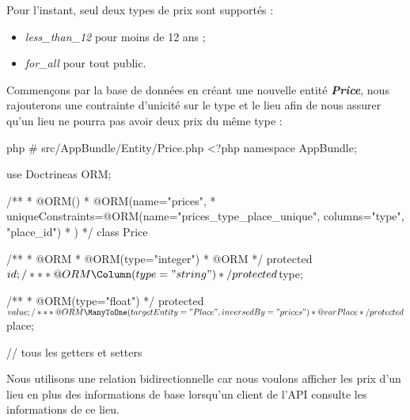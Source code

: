\documentclass[big]{zmdocument}
\begin{document}
Pour l'instant, seul deux types de prix sont supportés :



\begin{itemize}
\item \textit{less\_than\_12} pour moins de 12 ans ;
\item \textit{for\_all} pour tout public.
\end{itemize}


Commençons par la base de données en créant une nouvelle entité \textbf{\textit{Price}}, nous rajouterons une contrainte d'unicité sur le type et le lieu afin de nous assurer qu'un lieu ne pourra pas avoir deux prix du même type :



\begin{CodeBlock}{php}
# src/AppBundle/Entity/Price.php
<?php
namespace AppBundle\Entity;

use Doctrine\ORM\Mapping as ORM;

/**
 * @ORM\Entity()
 * @ORM\Table(name="prices",
 *      uniqueConstraints={@ORM\UniqueConstraint(name="prices_type_place_unique", columns={"type", "place_id"})}
 * )
 */
class Price
{
    /**
     * @ORM\Id
     * @ORM\Column(type="integer")
     * @ORM\GeneratedValue
     */
    protected $id;
    
    /**
     * @ORM\Column(type="string")
     */
    protected $type;
    
    /**
     * @ORM\Column(type="float")
     */
    protected $value;

    /**
     * @ORM\ManyToOne(targetEntity="Place", inversedBy="prices")
     * @var Place
     */
    protected $place;
 
    // tous les getters et setters
}
\end{CodeBlock}



Nous utilisons une relation bidirectionnelle car nous voulons afficher les prix d'un lieu en plus des informations de base lorsqu'un client de l'API consulte les informations de ce lieu.
\end{document}
